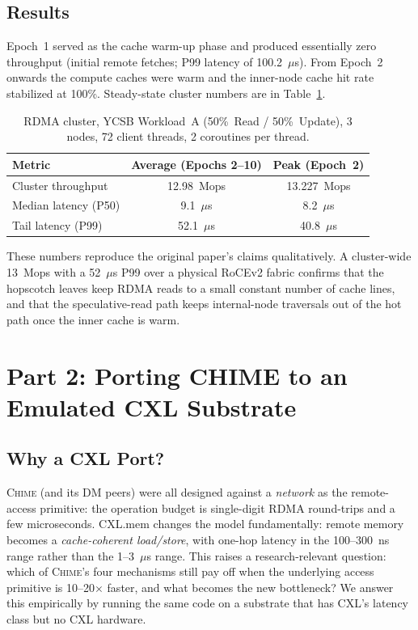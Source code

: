 \documentclass[11pt]{article}
\begin{document}
\subsection{Results}
Epoch~1 served as the cache warm-up phase and produced essentially zero throughput (initial remote fetches; P99 latency of 100.2~$\mu$s). From Epoch~2 onwards the compute caches were warm and the inner-node cache hit rate stabilized at 100\%. Steady-state cluster numbers are in Table~\ref{tab:p1_results}.

\begin{table}[h]
\centering
\begin{tabular}{@{}lcc@{}}
\toprule
\textbf{Metric} & \textbf{Average (Epochs 2--10)} & \textbf{Peak (Epoch~2)} \\ \midrule
Cluster throughput & 12.98~Mops & 13.227~Mops \\
Median latency (P50) & 9.1~$\mu$s & 8.2~$\mu$s \\
Tail latency (P99) & 52.1~$\mu$s & 40.8~$\mu$s \\ \bottomrule
\end{tabular}
\caption{RDMA cluster, YCSB Workload~A (50\%~Read / 50\%~Update), 3 nodes, 72 client threads, 2 coroutines per thread.}
\label{tab:p1_results}
\end{table}

These numbers reproduce the original paper's claims qualitatively. A cluster-wide 13~Mops with a 52~$\mu$s P99 over a physical RoCEv2 fabric confirms that the hopscotch leaves keep RDMA reads to a small constant number of cache lines, and that the speculative-read path keeps internal-node traversals out of the hot path once the inner cache is warm.

\section{Part 2: Porting CHIME to an Emulated CXL Substrate}
\label{sec:cxlport}

\subsection{Why a CXL Port?}
\textsc{Chime} (and its DM peers) were all designed against a \emph{network} as the remote-access primitive: the operation budget is single-digit RDMA round-trips and a few microseconds. CXL.mem changes the model fundamentally: remote memory becomes a \emph{cache-coherent load/store}, with one-hop latency in the 100--300~ns range rather than the 1--3~$\mu$s range. This raises a research-relevant question: which of \textsc{Chime}'s four mechanisms still pay off when the underlying access primitive is 10--20$\times$ faster, and what becomes the new bottleneck? We answer this empirically by running the same code on a substrate that has CXL's latency class but no CXL hardware.
\end{document}
